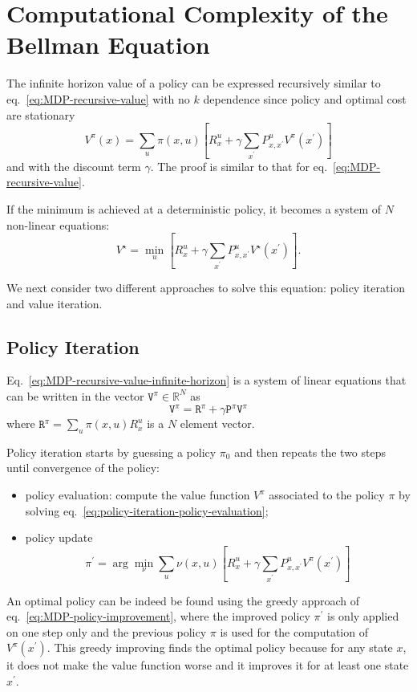 \section{Computational Complexity of the Bellman Equation}
\label{sec:MDP-computation-complexity-bellman-eq}

The infinite horizon value of a policy can be expressed recursively similar to eq.~\eqref{eq:MDP-recursive-value} with no $k$ dependence since policy and optimal cost are stationary
\begin{equation}
  \label{eq:MDP-recursive-value-infinite-horizon}
  V^\pi(x) = \sum_u \pi(x,u)\left[R^u_x + \gamma \sum_{x^\prime}P^u_{x,x^\prime} V^\pi(x^\prime)\right]
\end{equation}
and with the discount term $\gamma$. The proof is similar to that for eq.~\eqref{eq:MDP-recursive-value}.

If the minimum is achieved at a deterministic policy, it becomes a system of $N$ non-linear equations:
\begin{equation*}
  V^\star = \min_u \left[R^u_x + \gamma \sum_{x^\prime}P^u_{x,x^\prime} V^\star(x^\prime)\right].
\end{equation*}

We next consider two different approaches to solve this equation: policy iteration and value iteration.

\subsection{Policy Iteration}
\label{sec:MDP-policy-iteration}

Eq.~\eqref{eq:MDP-recursive-value-infinite-horizon} is a system of linear equations that can be written in the vector $\mathtt{V}^\pi\in\mathbb{R}^N$ as
\begin{equation}
  \label{eq:policy-iteration-policy-evaluation}
  \mathtt{V}^\pi = \mathtt{R}^\pi + \gamma \mathtt{P}^\pi \mathtt{V}^\pi
\end{equation}
where $\mathtt{R}^\pi = \sum_u \pi(x,u)R_x^u$ is a $N$ element vector.

Policy iteration starts by guessing a policy $\pi_0$ and then repeats the two steps until convergence of the policy:
\begin{itemize}
\item policy evaluation: compute the value function $V^\pi$ associated to the policy $\pi$ by solving eq.~\eqref{eq:policy-iteration-policy-evaluation};
\item policy update
  \begin{equation}
    \label{eq:MDP-policy-improvement}
    \pi^\prime = \arg \min_\nu \sum_u \nu(x,u)\left[R^u_x + \gamma \sum_{x^\prime}P^u_{x,x^\prime} V^\pi(x^\prime)\right]
  \end{equation}
\end{itemize}
An optimal policy can be indeed be found using the greedy approach of eq.~\eqref{eq:MDP-policy-improvement}, where the improved policy $\pi^\prime$ is only applied on one step only and the previous policy $\pi$ is used for the computation of $V^\pi(x^\prime)$. This greedy improving finds the optimal policy because for any state $x$, it does not make the value function worse and it improves it for at least one state $x^\prime$.

